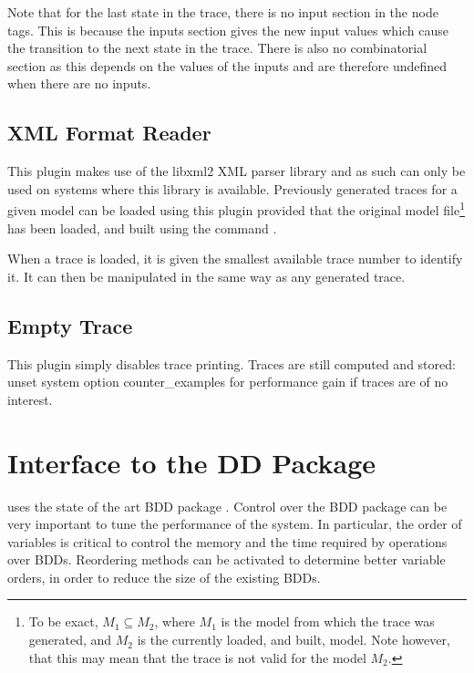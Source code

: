 Note that for the last state in the trace, there is no input section
in the node tags. This is because the inputs section gives the new
input values which cause the transition to the next state in the
trace. There is also no combinatorial section as this depends on the
values of the inputs and are therefore undefined when there are no
inputs.


\subsection{XML Format Reader}
\label{XML Format Reader}

This plugin makes use of the libxml2 XML parser library and as such can
only be used on systems where this library is available. Previously
generated traces for a given model can be loaded using this plugin
provided that the original model file\footnote{To be exact, $M_1
\subseteq M_2$, where $M_1$ is the model from which the trace was
generated, and $M_2$ is the currently loaded, and built, model. Note
however, that this may mean that the trace is not valid for the model
$M_2$.} has been loaded, and built using the command .

When a trace is loaded, it is given the smallest available trace
number to identify it. It can then be manipulated in the same way as
any generated trace.

\subsection{Empty Trace}
\label{Empty Trace}
This plugin simply disables trace printing. Traces are still computed and
stored: unset system option counter\_examples for performance gain if traces are
of no interest.

\section{Interface to the DD Package}
\label{Interface to DD package}
\label{DD package interface}

\nusmv uses the state of the art BDD package \cudd \cite{Som98}.
Control over the BDD package can be very important to tune the
performance of the system. In particular, the order of variables is
critical to control the memory and the time required by operations
over BDDs.  Reordering methods can be activated to determine better
variable orders, in order to reduce the size of the existing BDDs.

